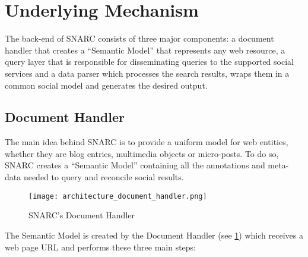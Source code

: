 \section{Underlying Mechanism}
The back-end of SNARC consists of three major components: a document handler that creates a ``Semantic Model'' that represents any web resource, a query layer that is responsible for disseminating queries to the supported social services and a data parser which processes the search results, wraps them in a common social model and generates the desired output.

\subsection{Document Handler}
The main idea behind SNARC is to provide a uniform model for web entities, whether they are blog entries, multimedia objects or micro-posts. To do so, SNARC creates a ``Semantic Model'' containing all the annotations and meta-data needed to query and reconcile social results.

\begin{figure}[!ht]
  \centering
    \texttt{[image: architecture\_document\_handler.png]}
  \caption{SNARC's Document Handler}
  \label{fig:architecture_document_handler}
\end{figure}

The Semantic Model is created by the Document Handler (see \ref{fig:architecture_document_handler}) which receives a web page URL and performs these three main steps:

